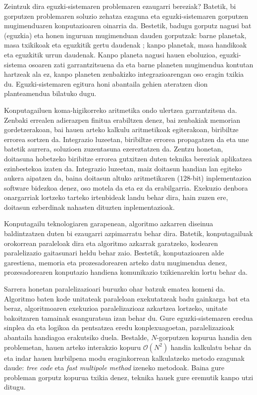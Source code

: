 Zeintzuk dira eguzki-sistemaren problemaren ezaugarri bereziak? Batetik, bi gorputzen problemaren  soluzio zehatza ezaguna eta eguzki-sistemaren gorputzen mugimenduaren konputazioaren oinarria da. Bestetik,  badugu gorputz nagusi bat (eguzkia) eta honen inguruan mugimenduan dauden gorputzak: barne planetak, masa txikikoak eta eguzkitik gertu daudenak ; kanpo planetak, masa handikoak eta eguzkitik urrun daudenak. Kanpo planeta nagusi hauen eboluzioa, eguzki-sistema osoaren zati garrantzitsuena da eta barne planeten mugimendua kontutan hartzeak ala ez, kanpo planeten zenbakizko integrazioarengan oso eragin txikia du. Eguzki-sistemaren egitura honi abantaila gehien ateratzen dion planteamendua bilatuko dugu.
  
Konputagailuen koma-higikorreko aritmetika ondo ulertzea garrantzitsua da. Zenbaki errealen adierazpen finitua erabiltzen denez, bai zenbakiak memorian gordetzerakoan, bai hauen arteko kalkulu aritmetikoak egiterakoan, biribiltze errorea sortzen da. Integrazio luzeetan, biribiltze errorea propagatzen da eta une batetik aurrera, soluzioen zuzentasuna ezereztatzen da. Zentzu honetan, doitasuna hobetzeko biribitze errorea gutxitzen duten teknika bereziak aplikatzea ezinbestekoa izaten da. Integrazio luzeetan, maiz doitasun handian lan egiteko aukera aipatzen da, baina doitasun altuko aritmetikaren ($128$-bit) inplementazioa software bidezkoa denez, oso motela da eta ez da erabilgarria. Exekuzio denbora onargarriak lortzeko tarteko irtenbideak landu behar dira, hain zuzen ere, doitasun ezberdinak nahasten dituzten inplementazioak.       

Konputagailu teknologiaren garapenean, algoritmo azkarren diseinua baldintzatzen duten bi ezaugarri azpimarratu behar dira. Batetik, konputagailuak orokorrean paraleloak dira eta algoritmo azkarrak garatzeko, kodearen paralelizazio gaitasunari heldu behar zaio. Bestetik, konputazioaren alde garestiena, memoria eta prozesadorearen arteko datu mugimendua denez, prozesadorearen konputazio handiena komunikazio txikienarekin lortu behar da. 

Sarrera honetan paralelizazioari buruzko ohar batzuk ematea komeni da. Algoritmo baten kode unitateak paraleloan exekutatzeak badu gainkarga bat eta beraz,  algoritmoaren exekuzioa paralelizazioaz azkartzea lortzeko,  unitate bakoitzaren tamainak esanguratsua izan behar du. Gure eguzki-sistemaren eredua sinplea da eta logikoa da pentsatzea eredu konplexuagoetan, paralelizazioak abantaila handiagoa erakutsiko duela. Bestalde, $N$-gorputzen kopurua handia den problemetan, hauen arteko interakzio kopuru $\mathcal{O}(N^2)$ handia kalkulatu behar da eta indar hauen hurbilpena modu eraginkorrean kalkulatzeko metodo ezagunak daude: \textit {tree code}\cite{Barnes1986} eta \textit {fast multipole method}\cite{Carrier1988} izeneko metodoak. Baina gure probleman gorputz kopurua txikia denez, teknika hauek gure eremutik kanpo utzi ditugu. 


